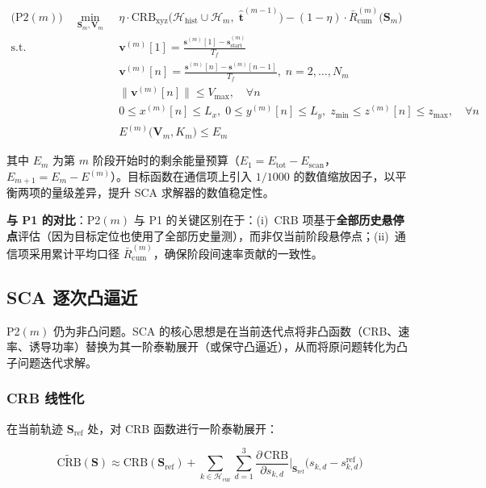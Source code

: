 \begin{align}
\text{(P2}(m))\quad\min_{\mathbf{S}_m,\mathbf{V}_m}\;&
\eta\cdot\mathrm{CRB}_{\mathrm{xyz}}\bigl(\mathcal{H}_{\mathrm{hist}}\cup\mathcal{H}_m,\;\hat{\mathbf{t}}^{(m-1)}\bigr)
-(1-\eta)\cdot\bar{R}_{\mathrm{cum}}^{(m)}\bigl(\mathbf{S}_m\bigr)\\
\text{s.t.}\;&\mathbf{v}^{(m)}[1]=\frac{\mathbf{s}^{(m)}[1]-\mathbf{s}_{\mathrm{start}}^{(m)}}{T_f}\\
&\mathbf{v}^{(m)}[n]=\frac{\mathbf{s}^{(m)}[n]-\mathbf{s}^{(m)}[n-1]}{T_f},\; n=2,\ldots,N_m\\
&\|\mathbf{v}^{(m)}[n]\|\leq V_{\max},\quad\forall n\\
&0\leq x^{(m)}[n]\leq L_x,\;0\leq y^{(m)}[n]\leq L_y,\;z_{\min}\leq z^{(m)}[n]\leq z_{\max},\quad\forall n\\
&E^{(m)}\bigl(\mathbf{V}_m,K_m\bigr)\leq E_m
\label{eq:p2m}
\end{align}

其中 $E_m$ 为第 $m$ 阶段开始时的剩余能量预算（$E_1=E_{\mathrm{tot}}-E_{\mathrm{scan}}$，$E_{m+1}=E_m-E^{(m)}$）。目标函数在通信项上引入 $1/1000$ 的数值缩放因子，以平衡两项的量级差异，提升 SCA 求解器的数值稳定性。

\textbf{与 P1 的对比}：P2$(m)$ 与 P1 的关键区别在于：(i)~CRB 项基于\textbf{全部历史悬停点}评估（因为目标定位也使用了全部历史量测），而非仅当前阶段悬停点；(ii)~通信项采用累计平均口径 $\bar{R}_{\mathrm{cum}}^{(m)}$，确保阶段间速率贡献的一致性。

\subsection{SCA 逐次凸逼近}

P2$(m)$ 仍为非凸问题。SCA 的核心思想是在当前迭代点将非凸函数（CRB、速率、诱导功率）替换为其一阶泰勒展开（或保守凸逼近），从而将原问题转化为凸子问题迭代求解\cite{Zeng2016}。

\subsubsection{CRB 线性化}

在当前轨迹 $\mathbf{S}_{\mathrm{ref}}$ 处，对 CRB 函数进行一阶泰勒展开：

\begin{equation}
\widetilde{\mathrm{CRB}}(\mathbf{S})\approx\mathrm{CRB}(\mathbf{S}_{\mathrm{ref}})+
\sum_{k\in\mathcal{H}_{\mathrm{cur}}}\sum_{d=1}^{3}\frac{\partial\,\mathrm{CRB}}{\partial s_{k,d}}\Bigr|_{\mathbf{S}_{\mathrm{ref}}}\!
\bigl(s_{k,d}-s_{k,d}^{\mathrm{ref}}\bigr)
\label{eq:crb_linearization}
\end{equation}

